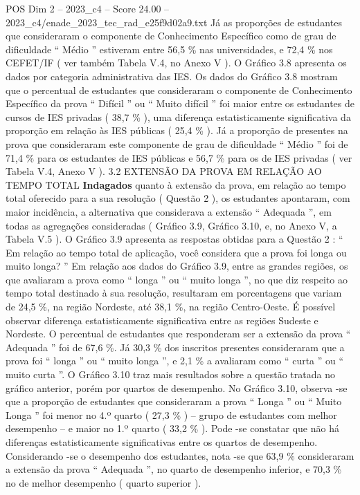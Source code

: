 \begin{textsample}{POS Dim 2 – 2023\_c4 – Score 24.00 – 2023\_c4/enade\_2023\_tec\_rad\_e25f9d02a9.txt}
Já as proporções de estudantes que consideraram o componente de Conhecimento Específico como de grau de dificuldade “ Médio ” estiveram entre 56,5 \% nas universidades, e 72,4 \% nos CEFET/IF ( ver também Tabela V.4, no Anexo V ).
O Gráfico 3.8 apresenta os dados por categoria administrativa das IES.
Os dados do Gráfico 3.8 mostram que o percentual de estudantes que consideraram o componente de Conhecimento Específico da prova “ Difícil ” ou “ Muito difícil ” foi maior entre os estudantes de cursos de IES privadas ( 38,7 \% ), uma diferença estatisticamente significativa da proporção em relação às IES públicas ( 25,4 \% ).
Já a proporção de presentes na prova que consideraram este componente de grau de dificuldade “ Médio ” foi de 71,4 \% para os estudantes de IES públicas e 56,7 \% para os de IES privadas ( ver Tabela V.4, Anexo V ). 3.2 EXTENSÃO DA PROVA EM RELAÇÃO AO TEMPO TOTAL \textbf{Indagados} quanto à extensão da prova, em relação ao tempo total oferecido para a sua resolução ( Questão 2 ), os estudantes apontaram, com maior incidência, a alternativa que considerava a extensão “ Adequada ”, em todas as agregações consideradas ( Gráfico 3.9, Gráfico 3.10, e, no Anexo V, a Tabela V.5 ).
O Gráfico 3.9 apresenta as respostas obtidas para a Questão 2 : “ Em relação ao tempo total de aplicação, você considera que a prova foi longa ou muito longa? ” Em relação aos dados do Gráfico 3.9, entre as grandes regiões, os que avaliaram a prova como “ longa ” ou “ muito longa ”, no que diz respeito ao tempo total destinado à sua resolução, resultaram em porcentagens que variam de 24,5 \%, na região Nordeste, até 38,1 \%, na região Centro-Oeste.
É possível observar diferença estatisticamente significativa entre as regiões Sudeste e Nordeste.
O percentual de estudantes que responderam ser a extensão da prova “ Adequada ” foi de 67,6 \%.
Já 30,3 \% dos inscritos presentes consideraram que a prova foi “ longa ” ou “ muito longa ”, e 2,1 \% a avaliaram como “ curta ” ou “ muito curta ”.
O Gráfico 3.10 traz mais resultados sobre a questão tratada no gráfico anterior, porém por quartos de desempenho.
No Gráfico 3.10, observa -se que a proporção de estudantes que consideraram a prova “ Longa ” ou “ Muito Longa ” foi menor no 4.º quarto ( 27,3 \% ) – grupo de estudantes com melhor desempenho – e maior no 1.º quarto ( 33,2 \% ).
Pode -se constatar que não há diferenças estatisticamente significativas entre os quartos de desempenho.
Considerando -se o desempenho dos estudantes, nota -se que 63,9 \% consideraram a extensão da prova “ Adequada ”, no quarto de desempenho inferior, e 70,3 \% no de melhor desempenho ( quarto superior ).

\end{textsample}
